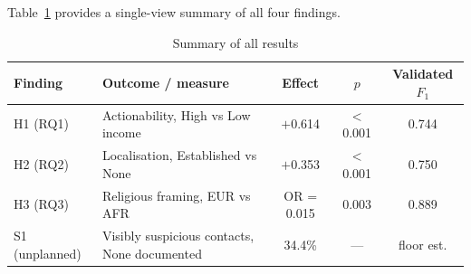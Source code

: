 Table~\ref{tab:results_summary} provides a single-view summary of all four findings.

\begin{table}[H]
\centering
\caption{Summary of all results}
\label{tab:results_summary}
\begin{tabular}{llccc}
\toprule
Finding & Outcome / measure & Effect & $p$ & Validated $F_1$ \\
\midrule
H1 (RQ1) & Actionability, High vs Low income & $+$0.614 & $<$0.001 & 0.744 \\
H2 (RQ2) & Localisation, Established vs None & $+$0.353 & $<$0.001 & 0.750 \\
H3 (RQ3) & Religious framing, EUR vs AFR & OR = 0.015 & 0.003 & 0.889 \\
S1 (unplanned) & Visibly suspicious contacts, None documented & 34.4\% & --- & floor est. \\
\bottomrule
\end{tabular}
\end{table}
